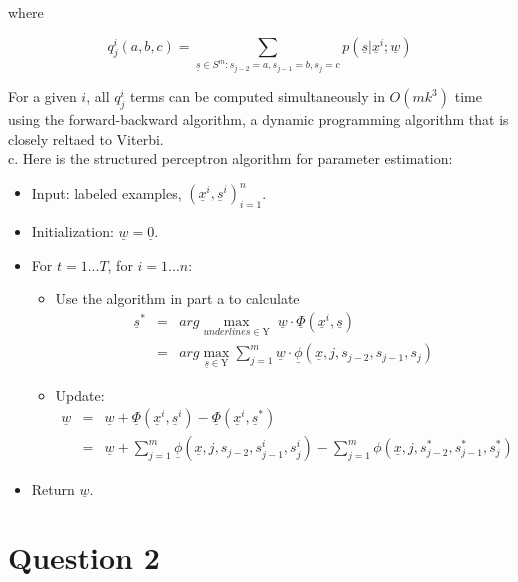 \documentclass[12pt]{article}
\begin{document}
where

\begin{equation*}
q_j^i(a,b,c) =
\sum_{\underline {s} \in S^m: s_{j-2} = a, s_{j-1} = b, s_j = c}
{p(\underline {s} | \underline {x}^i; \underline {w})}
\end{equation*}

For a given $i$, all $q_j^i$ terms can be computed simultaneously in
$O(mk^3)$ time using the forward-backward algorithm, a dynamic
programming algorithm that is closely reltaed to Viterbi.\\

c. Here is the structured perceptron algorithm for parameter
estimation:

\begin{itemize}
\item Input: labeled examples, ${(\underline {x}^i,
    \underline{s}^i)}_{i=1}^n$.
\item Initialization: $\underline {w} = \underline {0}$.
\item For $t = 1...T$, for $i = 1...n:$
  \begin{itemize}
    \item Use the algorithm in part a to calculate
      \begin{eqnarray*}
        \underline {s}^* &=& arg \max_{underline {s} \in \mathrm{Y}} \;
        {\underline {w} \cdot \underline {\Phi} (\underline {x}^i,
          \underline {s})} \\
        &=& arg \max_{\underline{s} \in \mathrm{Y}} {\sum_{j=1}^m
          {\underline {w} \cdot \underline {\phi} (\underline {x}, j,
            s_{j-2}, s_{j-1}, s_j) }}
      \end{eqnarray*}
    \item Update:
      \begin{eqnarray*}
        \underline {w} &=& \underline {w} + \underline
        {\Phi} (\underline {x}^i, \underline{s}^i) - \underline{\Phi}
        (\underline {x}^i, \underline{s}^*)\\
        &=& \underline {w} + \sum_{j=1}^m {\underline {\phi}
          (\underline {x}, j, s_{j-2}, s_{j-1}^i, s_j^i)} -
        \sum_{j=1}^m {\phi} (\underline {x}, j, s_{j-2}^*, s_{j-1}^*, s_j^*)
      \end{eqnarray*}
  \end{itemize}
\item Return $\underline {w}$.
\end{itemize}

\section*{Question 2}
\end{document}

